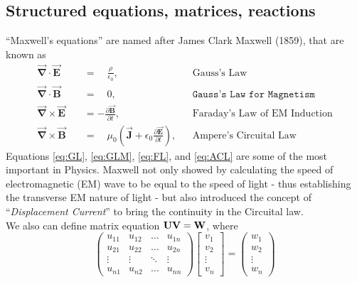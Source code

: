 \documentclass[onecolumn,12pt]{article}
\begin{document}
\subsection{Structured equations, matrices, reactions}
``Maxwell's equations'' are named after James Clark Maxwell (1859), that are known as
\begin{align}             
	\vec{\pmb \nabla} \cdot \vec{\pmb E} \quad &=\quad\frac{\rho}{\epsilon_0}, &&\text{Gauss's Law} \label{eq:GL}\\      
	\vec{\pmb \nabla} \cdot \vec{\pmb B} \quad &=\quad 0, &&\texttt{Gauss's Law for Magnetism} \label{eq:GLM}\\
	\vec{\pmb \nabla} \times \vec{\pmb E} \quad &=-\frac{\partial{\vec{\pmb B}}}{\partial{t}}, &&\text{Faraday's Law of EM Induction} \label{eq:FL}\\ 
	\vec{\pmb \nabla} \times \vec{\pmb B} \quad &=\quad \mu_0\left(\vec{\pmb J} + \epsilon_0\frac{\partial{\vec{\pmb E}}}{\partial{t}}\right), &&\text{Ampere's Circuital Law} \label{eq:ACL}
\end{align}
Equations \ref{eq:GL}, \ref{eq:GLM}, \ref{eq:FL}, and \ref{eq:ACL} are some of the most important in Physics. Maxwell not only showed by calculating the speed of electromagnetic (EM) wave to be equal to the speed of light - thus establishing the transverse EM nature of light - but also introduced the concept of ``{\it Displacement Current}'' to bring the continuity in the Circuital law. \\

We also can define matrix equation ${\bold U}{\bold V} = {\bold W}$, where
\begin{equation*}
	\begin{pmatrix}
		u_{11}&u_{12}&\dots&u_{1n}\\
		u_{21}&u_{22}&\dots&u_{2n}\\
		\vdots&\vdots&\ddots&\vdots\\
		u_{n1}&u_{n2}&\dots&u_{nn}
	\end{pmatrix}
	\begin{bmatrix}
		v_{1}\\
		v_{2}\\
		\vdots\\
		v_{n}
	\end{bmatrix}
	=
	\begin{pmatrix}
		w_{1}\\
		w_{2}\\
		\vdots\\
		w_{n}
	\end{pmatrix}
\end{equation*}
\end{document}
